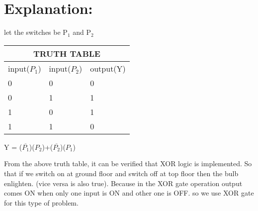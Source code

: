 \documentclass{article}
\begin{document}
\maketitle
\section{Explanation:}
let the switches be P$_1$ and P$_2$\newline


\setlength{\arrayrulewidth}{1mm}
\setlength{\tabcolsep}{18pt}
\renewcommand{\arraystretch}{1.5}



\begin{tabular}{ |p{1cm}|p{1cm}|p{1cm}| }
\hline
\multicolumn{3}{|c|}{ TRUTH TABLE } \\
\hline
input($P_1$) & input($P_2$) & output(Y) \\
\hline
  0 & 0 & 0 \\
\hline
0 & 1 & 1 \\
\hline
1 & 0 & 1 \\
\hline
1 & 1 & 0  \\
\hline

\end{tabular}


\vspace{1cm}


Y = ($\overline{P_1}$)($P_2$)+($\overline{P_2}$)($P_1$)
 
From the above truth table, it can be verified that XOR logic is implemented.
So that if we  switch on at ground floor and switch off at top floor then the bulb enlighten. (vice versa is also true). Because in the XOR gate operation output comes ON when only one input is ON and other one is OFF. so we use XOR gate for this type of problem. 
\end{document}
